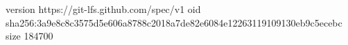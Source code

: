 version https://git-lfs.github.com/spec/v1
oid sha256:3a9e8c8c3575d5e606a8788c2018a7de82e6084e12263119109130eb9c5ecebc
size 184700
